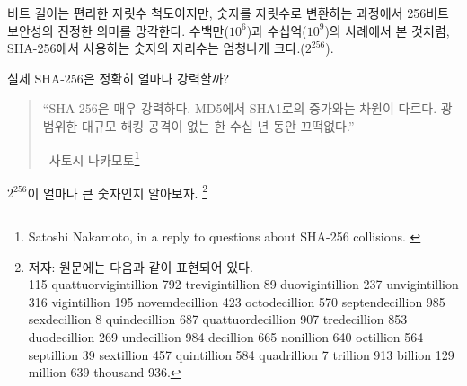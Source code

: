 \begin{comment}
While bit length is a convenient metric, the true meaning of 256-bit
security is lost in translation. Similar to the millions ($10^6$) and
billions ($10^9$) above, the number in SHA-256 is about orders of magnitude
($2^{256}$).
\end{comment}
비트 길이는 편리한 자릿수 척도이지만, 숫자를 자릿수로 변환하는 과정에서 256비트 보안성의 진정한 의미를 망각한다.
수백만($10^6$)과 수십억($10^9$)의 사례에서 본 것처럼, SHA-256에서 사용하는 숫자의 자리수는 엄청나게 크다.($2^{256}$).
\begin{comment}
So, how strong is SHA-256, exactly?
\end{comment}
실제 SHA-256은 정확히 얼마나 강력할까?
\begin{comment}
\begin{quotation}\begin{samepage}
\enquote{SHA-256 is very strong. It's not like the incremental step from MD5
to SHA1. It can last several decades unless there's some massive
breakthrough attack.}
\begin{flushright} -- Satoshi Nakamoto\footnote{Satoshi Nakamoto, in a reply to questions about SHA-256 collisions. \cite{satoshi-sha256}}
\end{flushright}\end{samepage}\end{quotation}
\end{comment}
\begin{quotation}\begin{samepage}
		\enquote{SHA-256은 매우 강력하다. MD5에서 SHA1로의 증가와는 차원이 다르다.
		광범위한 대규모 해킹 공격이 없는 한 수십 년 동안 끄떡없다.}
		\begin{flushright} --사토시 나카모토\footnote{Satoshi Nakamoto, in a reply to questions about SHA-256 collisions. \cite{satoshi-sha256}}
\end{flushright}\end{samepage}\end{quotation}


$2^{256}$이 얼마나 큰 숫자인지 알아보자.
\footnote{
	저자: 원문에는 다음과 같이 표현되어 있다. \\
	115 quattuorvigintillion 792 trevigintillion 89 duovigintillion 237
	unvigintillion 316 vigintillion 195 novemdecillion 423 octodecillion 570
	septendecillion 985 sexdecillion 8 quindecillion 687 quattuordecillion 907
	tredecillion 853 duodecillion 269 undecillion 984 decillion 665 nonillion
	640 octillion 564 septillion 39 sextillion 457 quintillion 584 quadrillion 7
	trillion 913 billion 129 million 639 thousand 936.}

